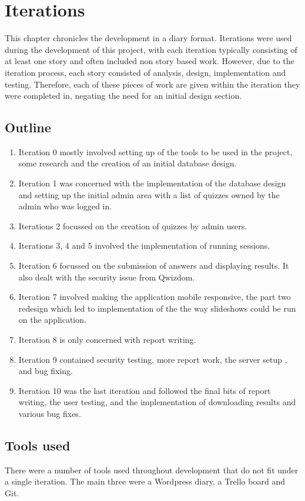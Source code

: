 \chapter{Iterations}
This chapter chronicles the development in a diary format. Iterations were used during the development of this project, with each iteration typically consisting of at least one story and often included non story based work. However, due to the iteration process, each story consisted of analysis, design, implementation and testing. Therefore, each of these pieces of work are given within the iteration they were completed in, negating the need for an initial design section.

\section{Outline}
\begin{enumerate}
	\item Iteration 0 mostly involved setting up of the tools to be used in the project, some research and the creation of an initial database design.
	\item Iteration 1 was concerned with the implementation of the database design and setting up the initial admin area with a list of quizzes owned by the admin who was logged in.
	\item Iterations 2 focussed on the creation of quizzes by admin users.
	\item Iterations 3, 4 and 5 involved the implementation of running sessions.
	\item Iteration 6 focussed on the submission of answers and displaying results. It also dealt with the security issue from Qwizdom.
	\item Iteration 7 involved making the application mobile responsive, the part two redesign which led to implementation of the the way slideshows could be run on the application.
	\item Iteration 8 is only concerned with report writing.
	\item Iteration 9 contained security testing, more report work, the server setup , and bug fixing.
	\item Iteration 10 was the last iteration and followed the final bits of report writing, the user testing, and the implementation of downloading results and various bug fixes.
\end{enumerate}

\section{Tools used}
There were a number of tools used throughout development that do not fit under a single iteration. The main three were a Wordpress diary, a Trello board and Git. 

